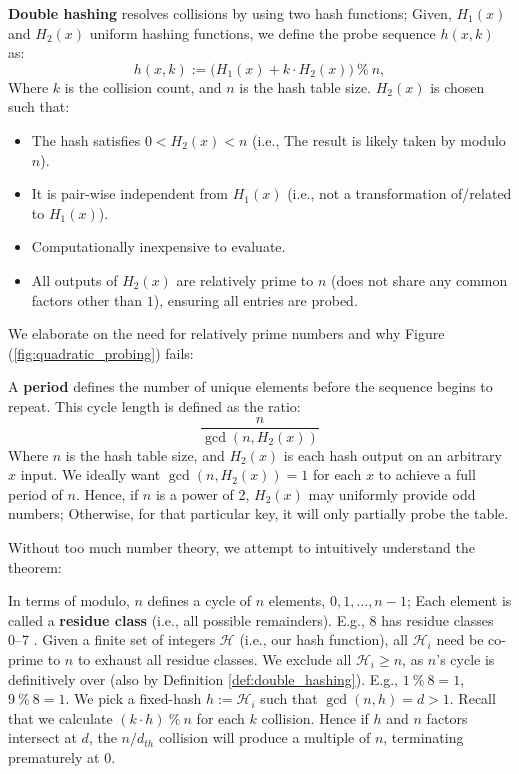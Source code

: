 \newpage 

\begin{Def}

  \label{def:double_hashing}
  \textbf{Double hashing} resolves collisions by using two hash functions; Given, $H_1(x)$ and $H_2(x)$ uniform hashing functions,
  we define the probe sequence $h(x,k)$ as:
  \[
    h(x,k) := \bigl(H_1(x) + k \cdot H_2(x)\bigr)\ \%\ n,
  \]
  Where $k$ is the collision count, and $n$ is the hash table size.
  $H_2(x)$ is chosen such that:
  \begin{itemize}
    \item The hash satisfies $0 < H_2(x) < n$ (i.e., The result is likely taken by modulo $n$).
    \item It is pair-wise independent from $H_1(x)$ (i.e., not a transformation of/related to $H_1(x)$).
    \item Computationally inexpensive to evaluate.
    \item All outputs of $H_2(x)$ are relatively prime to $n$ (does not share any common factors other than $1$), ensuring all entries are probed.
  \end{itemize}
\end{Def}

\noindent 
We elaborate on the need for relatively prime numbers and why Figure (\ref{fig:quadratic_probing}) fails:
\begin{theo}
 
    \label{thm:probes_period}
    A \textbf{period} defines the number of unique elements before the sequence begins to repeat. This cycle length is defined as the ratio:
    \[ \dfrac{n}{\gcd(n, H_2(x))} \]
    Where $n$ is the hash table size, and $H_2(x)$ is each hash output on an arbitrary $x$ input. We ideally want $\gcd(n, H_2(x))=1$ 
    for each $x$ to achieve a full period of $n$. Hence, if $n$ is a power of 2,
    $H_2(x)$ may uniformly provide odd numbers; Otherwise, for that particular key, it will only partially probe the table.
\end{theo}

\noindent
Without too much number theory, we attempt to intuitively understand the theorem:
\begin{Proof}

    \label{proof:probes_period}
    In terms of modulo, $n$ defines a cycle of $n$ elements, $0, 1, \ldots, n-1$; Each element is called a \textbf{residue class} (i.e., all possible remainders).
    E.g., 8 has residue classes 0--7 . Given a finite set of integers $\mathcal{H}$ (i.e., our hash function),
    all $\mathcal{H}_i$ need be co-prime to $n$ to exhaust all residue classes. We exclude all $\mathcal{H}_i \geq n$, as $n$'s cycle is definitively
    over (also by Definition \ref{def:double_hashing}). E.g., $1\ \%\ 8 = 1$, $9\ \%\ 8 = 1$. We pick a fixed-hash $h:=\mathcal{H}_i$ such that $\gcd(n, h) = d > 1$.
    Recall that we calculate $(k \cdot h)\ \%\ n$ for each $k$ collision. Hence if $h$ and $n$ factors intersect at $d$,
    the $n/d_{th}$ collision will produce a multiple of $n$, terminating prematurely at $0$.

\end{Proof}

